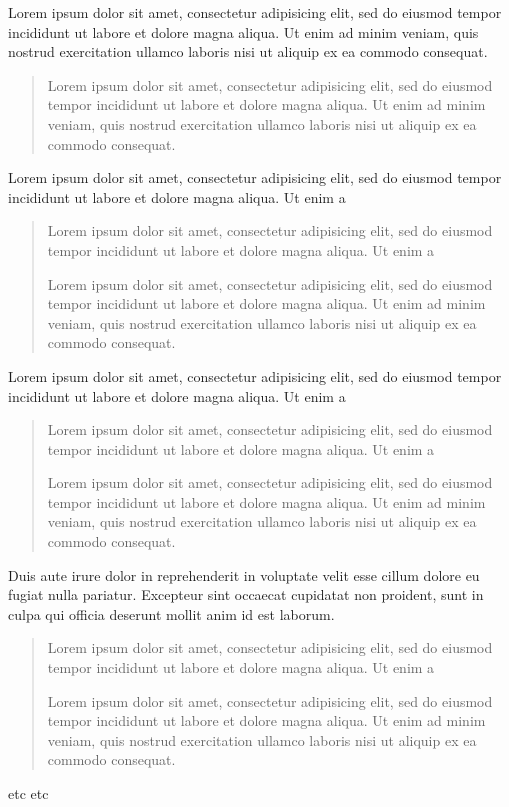 \documentclass{article}
\begin{document}
    Lorem ipsum dolor sit amet, consectetur adipisicing elit, sed do eiusmod tempor incididunt ut labore et dolore magna aliqua. Ut enim ad minim veniam, quis nostrud exercitation ullamco laboris nisi ut aliquip ex ea commodo consequat.  
    \begin{quotation}
        Lorem ipsum dolor sit amet, consectetur adipisicing elit, sed do eiusmod tempor incididunt ut labore et dolore magna aliqua. Ut enim ad minim veniam, quis nostrud exercitation ullamco laboris nisi ut aliquip ex ea commodo consequat. 
    \end{quotation}
      Lorem ipsum dolor sit amet, consectetur adipisicing elit, sed do eiusmod tempor incididunt ut labore et dolore magna aliqua. Ut enim a
    
    \begin{quote}
    
    Lorem ipsum dolor sit amet, consectetur adipisicing elit, sed do eiusmod tempor incididunt ut labore et dolore magna aliqua. Ut enim a
    
  Lorem ipsum dolor sit amet, consectetur adipisicing elit, sed do eiusmod tempor incididunt ut labore et dolore magna aliqua. Ut enim ad minim veniam, quis nostrud exercitation ullamco laboris nisi ut aliquip ex ea commodo consequat. 
    \end{quote}
\begingroup
  \beginnumbering
	
    \pstart
    \lipsum[1]
    \pend
	

    \pstart
    Lorem ipsum dolor sit amet, consectetur adipisicing elit, sed do eiusmod tempor incididunt ut labore et dolore magna aliqua. Ut enim a
    \begin{quotation}
    Lorem ipsum dolor sit amet, consectetur adipisicing elit, sed do eiusmod tempor incididunt ut labore et dolore magna aliqua. Ut enim a
    
  Lorem ipsum dolor sit amet, consectetur adipisicing elit, sed do eiusmod tempor incididunt ut labore et dolore magna aliqua. Ut enim ad minim veniam, quis nostrud exercitation ullamco laboris nisi ut aliquip ex ea commodo consequat. 
    \end{quotation}
  
  
   Duis aute irure dolor in reprehenderit in voluptate velit esse cillum dolore eu fugiat nulla pariatur. Excepteur sint occaecat cupidatat non proident, sunt in culpa qui officia deserunt mollit anim id est laborum.
    
     \begin{quote} 
    Lorem ipsum dolor sit amet, consectetur adipisicing elit, sed do eiusmod tempor incididunt ut labore et dolore magna aliqua. Ut enim a
    
  Lorem ipsum dolor sit amet, consectetur adipisicing elit, sed do eiusmod tempor incididunt ut labore et dolore magna aliqua. Ut enim ad minim veniam, quis nostrud exercitation ullamco laboris nisi ut aliquip ex ea commodo consequat. 
    \end{quote}
   
   
   etc etc
    
    \pend
    \pstart
    \lipsum[3]
    \pend

  \endnumbering
\endgroup
\end{document}
